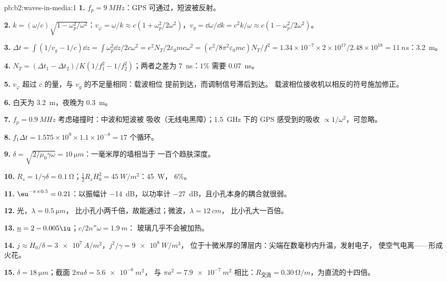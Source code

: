 \begin{solution}{pb:b2:waves-in-media:1}
\textbf{1.} $f_p = \qty{9}{MHz}$：GPS 可通过，短波被反射。

\textbf{2.} $k = (\omega/c)\sqrt{1 - \omega_p^2/\omega^2}$：$v_\varphi = \omega/k \approx c(1 + \omega_p^2/
2\omega^2)$，$v_g = \dd\omega/\dd k = c^2k/\omega \approx c(1 - \omega_p^2/2\omega^2)$。

\textbf{3.} $\Delta t = \int(1/v_g - 1/c)\dd z = \int\omega_p^2\dd z/2c\omega^2 = e^2N_T/2\varepsilon_0
mc\omega^2 = (e^2/8\pi^2\varepsilon_0mc)N_T/f^2 = 1.34 \times 10^{-7} \times 2 \times 10^{17}/2.48 \times
10^{18} = \qty{11}{ns}$：\qty{3.2}{m}。

\textbf{4.} $N_T = (\Delta t_1 - \Delta t_2)/K(1/f_1^2 - 1/f_2^2)$；两者之差为
\qty{7}{ns}：$1\%$ 需要 \qty{0.07}{ns}。

\textbf{5.} $v_\varphi$ 超过 $c$ 的量，与 $v_g$ 的不足量相同：载波相位
提前到达，而调制信号滞后到达。
载波相位接收机以相反的符号施加修正。

\textbf{6.} 白天为 \qty{3.2}{m}，夜晚为 \qty{0.3}{m}。

\textbf{7.} $f_p = \qty{0.9}{MHz}$ 考虑碰撞时：中波和短波被
吸收（无线电黑障）；\qty{1.5}{GHz} 下的 GPS 感受到的吸收
$\propto 1/\omega^2$，可忽略。

\textbf{8.} $f_1\Delta t = 1.575 \times 10^9 \times 1.1 \times 10^{-8} = 17$ 个循环。

\textbf{9.} $\delta = \sqrt{2/\mu_0\gamma\omega} = \qty{10}{\micro m}$：一毫米厚的墙相当于
一百个趋肤深度。

\textbf{10.} $R_s = 1/\gamma\delta = \qty{0.1}{\ohm}$；$\tfrac12R_sH_0^2 = \qty{45}{W/m^2}$：\qty{45}{W}，
$6\%$。

\textbf{11.} $\eu^{-\pi \times 0.5} = 0.21$：以振幅计 \qty{-14}{dB}，以功率计
\qty{-27}{dB}，且小孔本身的耦合就很弱。

\textbf{12.} 光，$\lambda = \qty{0.5}{\micro m}$，
比小孔小两千倍，故能通过；微波，$\lambda = \qty{12}{cm}$，
比小孔大一百倍。

\textbf{13.} $\underline n = 2 - 0.005\iu$；$c/2n''\omega = \qty{1.9}{m}$：
玻璃几乎不会被加热。

\textbf{14.} $j \approx H_0/\delta = \qty{3e7}{A/m^2}$，$j^2/\gamma = \qty{9e8}{W/m^3}$，
位于十微米厚的薄层内：尖端在数毫秒内升温，发射电子，
使空气电离——形成火花。

\textbf{15.} $\delta = \qty{18}{\micro m}$；截面 $2\pi a\delta = \qty{5.6e-8}{m^2}$，
与 $\pi a^2 = \qty{7.9e-7}{m^2}$ 相比：$R_{\text{交流}} = \qty{0.30}{\ohm/m}$，为直流的十四倍。


\end{solution}
